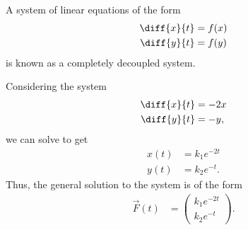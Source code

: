 \documentclass[10pt]{mypackage}
\begin{document}
\begin{definition}
  A system of linear equations of the form
  \begin{align*}
    \diff{x}{t} &= f(x)\\
    \diff{y}{t} &= f(y)
  \end{align*}
   is known as a completely decoupled system.
\end{definition}
\begin{example}
  Considering the system
  \begin{align*}
    \diff{x}{t} &= -2x\\
    \diff{y}{t} &= -y,
  \end{align*}
  we can solve to get
  \begin{align*}
    x(t) &= k_1e^{-2t}\\
    y(t) &= k_2e^{-t}.
  \end{align*}
  Thus, the general solution to the system is of the form
  \begin{align*}
    \vec{F}(t) &= \begin{pmatrix}k_1e^{-2t}\\k_2e^{-t}\end{pmatrix}.
  \end{align*}
\end{example}
\end{document}
